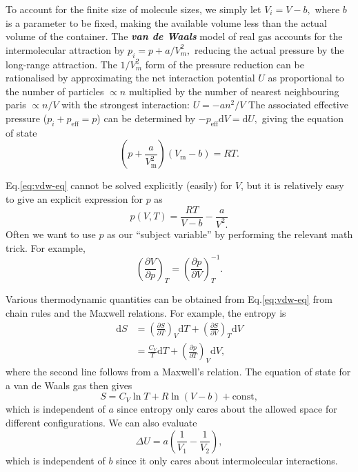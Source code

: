 \documentclass{article}
\theoremstyle{nonumberplain}
\begin{document}
To account for the finite size of molecule sizes, we simply let $V_i = V - b,$ where $b$ is a parameter to be fixed, making the available volume less than the actual volume of the container. The \textit{\textbf{van de Waals}} model of real gas accounts for the intermolecular attraction by $p_i = p + a/V_m^2,$ reducing the actual pressure by the long-range attraction. The $1 / V_m^2$ form of the pressure reduction can be rationalised by approximating the net interaction potential $U$ as proportional to the number of particles $\propto n$ multiplied by the number of nearest neighbouring paris $ \propto n/V$ with the strongest interaction: $U = -a n^2 /V$ The associated effective pressure ($p_i + p_{\mathrm{eff}} = p$) can be determined by $-p_{\mathrm{eff}} \mathrm{d}V = \mathrm{d} U,$ giving the equation of state 
\begin{equation}
    \label{eq:vdw-eq}
    \boxed{
        \left( p + \frac{a}{V_\mathrm{m}^2}\right) (V_\mathrm{m}  - b) = RT.
    }
\end{equation}

Eq.\eqref{eq:vdw-eq} cannot be solved explicitly (easily) for $V$, but it is relatively easy to give an explicit expression for $p$ as 
\[
    p(V,T) = \frac{RT}{V-b} - \frac{a}{V^{2}.}
\]
Often we want to use $p$ as our ``subject variable'' by performing the relevant math trick. For example, 
\[
    \left( \frac{\partial V}{\partial p} \right)_{T} = 
    \left( \frac{\partial p}{\partial V} \right)_{T} ^{-1}.
\]

Various thermodynamic quantities can be obtained from Eq.\eqref{eq:vdw-eq} from chain rules and the Maxwell relations. For example, the entropy is
\[
    \begin{aligned}
        \mathrm{d}S &= \left(\frac{\partial S}{\partial T}  \right)_V \mathrm{d}T + \left(\frac{\partial S}{\partial V}  \right)_T \mathrm{d}V  \\
        &= \frac{C_V}{T}\mathrm{d} T + \left(\frac{\partial p}{\partial T}  \right)_V \mathrm{d}V,
    \end{aligned}
\]
where the second line follows from a Maxwell's relation. The equation of state for a van de Waals gas then gives
\[
    S = C_V \ln T + R \ln (V -b) + \mathrm{const},
\]
which is independent of $a$ since entropy only cares about the allowed space for different configurations. We can also evaluate 
\[
    \Delta U = a \left( \frac{1}{V_1} - \frac{1}{V_2}\right),
\]
which is independent of $b$ since it only cares about intermolecular interactions. 
\end{document}
